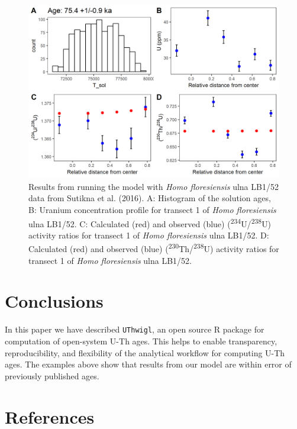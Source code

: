 \documentclass[]{elsarticle} %
\begin{document}
\begin{figure}
\includegraphics[width=0.95\linewidth]{figures/plot-panel-hobbit} \caption{Results from running the model with \emph{Homo floresiensis} ulna LB1/52 data from Sutikna et al. (2016). A: Histogram of the solution ages, B: Uranium concentration profile for transect 1 of \emph{Homo floresiensis} ulna LB1/52. C: Calculated (red) and observed (blue) (\textsuperscript{234}U/\textsuperscript{238}U) activity ratios for transect 1 of \emph{Homo floresiensis} ulna LB1/52. D: Calculated (red) and observed (blue) (\textsuperscript{230}Th/\textsuperscript{238}U) activity ratios for transect 1 of \emph{Homo floresiensis} ulna LB1/52.}\label{fig:plot-panel-hobbit-fig}
\end{figure}

\FloatBarrier

\hypertarget{conclusions}{%
\section{Conclusions}\label{conclusions}}

In this paper we have described \texttt{UThwigl}, an open source R package for computation of open-system U-Th ages. This helps to enable transparency, reproducibility, and flexibility of the analytical workflow for computing U-Th ages. The examples above show that results from our model are within error of previously published ages.

\newpage

\nolinenumbers

\hypertarget{references}{%
\section*{References}\label{references}}
\end{document}
